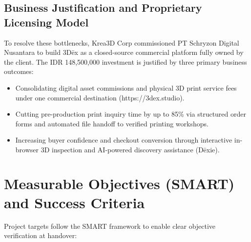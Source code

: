 \documentclass[11pt,a4paper]{article}
\begin{document}
\subsection{Business Justification and Proprietary Licensing Model}
To resolve these bottlenecks, Krea3D Corp commissioned PT Schryzon Digital Nusantara to build 3D\={e}x as a closed-source commercial platform fully owned by the client. The IDR 148,500,000 investment is justified by three primary business outcomes:
\begin{itemize}[leftmargin=1.5em, itemsep=2pt]
    \item Consolidating digital asset commissions and physical 3D print service fees under one commercial destination (https://3dex.studio).
    \item Cutting pre-production print inquiry time by up to 85\% via structured order forms and automated file handoff to verified printing workshops.
    \item Increasing buyer confidence and checkout conversion through interactive in-browser 3D inspection and AI-powered discovery assistance (D\={e}xie).
\end{itemize}

\section{Measurable Objectives (SMART) and Success Criteria}

Project targets follow the SMART framework to enable clear objective verification at handover:
\end{document}

